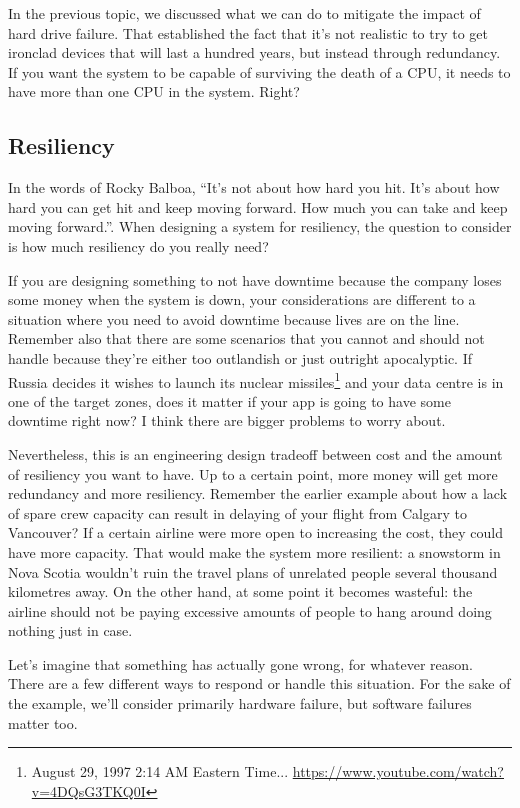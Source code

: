 In the previous topic, we discussed what we can do to mitigate the impact of hard drive failure. That established the fact that it's not realistic to try to get ironclad devices that will last a hundred years, but instead through redundancy. If you want the system to be capable of surviving the death of a CPU, it needs to have more than one CPU in the system. Right?

\subsection*{Resiliency}
In the words of Rocky Balboa, ``It's not about how hard you hit. It's about how hard you can get hit and keep moving forward. How much you can take and keep moving forward.''. When designing a system for resiliency, the question to consider is how much resiliency do you really need? 

If you are designing something to not have downtime because the company loses some money when the system is down, your considerations are different to a situation where you need to avoid downtime because lives are on the line. Remember also that there are some scenarios that you cannot and should not handle because they're either too outlandish or just outright apocalyptic. If Russia decides it wishes to launch its nuclear missiles\footnote{ August 29, 1997 2:14 AM Eastern Time... \url{https://www.youtube.com/watch?v=4DQsG3TKQ0I}} and your data centre is in one of the target zones, does it matter if your app is going to have some downtime right now? I think there are bigger problems to worry about.

Nevertheless, this is an engineering design tradeoff between cost and the amount of resiliency you want to have. Up to a certain point, more money will get more redundancy and more resiliency. Remember the earlier example about how a lack of spare crew capacity can result in delaying of your flight from Calgary to Vancouver? If a certain airline were more open to increasing the cost, they could have more capacity. That would make the system more resilient: a snowstorm in Nova Scotia wouldn't ruin the travel plans of unrelated people several thousand kilometres away. On the other hand, at some point it becomes wasteful: the airline should not be paying excessive amounts of people to hang around doing nothing just in case.

Let's imagine that something has actually gone wrong, for whatever reason. There are a few different ways to respond or handle this situation. For the sake of the example, we'll consider primarily hardware failure, but software failures matter too.

